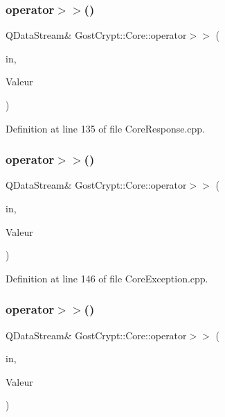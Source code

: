 \subsubsection{\texorpdfstring{operator$>$$>$()}{operator>>()}\hspace{0.1cm}{\footnotesize\ttfamily [21/56]}}
{\footnotesize\ttfamily Q\+Data\+Stream\& Gost\+Crypt\+::\+Core\+::operator$>$$>$ (\begin{DoxyParamCaption}\item[{Q\+Data\+Stream \&}]{in,  }\item[{\hyperlink{struct_gost_crypt_1_1_core_1_1_get_host_devices_response}{Get\+Host\+Devices\+Response} \&}]{Valeur }\end{DoxyParamCaption})}



Definition at line 135 of file Core\+Response.\+cpp.

\mbox{\label{namespace_gost_crypt_1_1_core_a817e52e44a7ae0fb21ee6539aba421c1}} 
\subsubsection{\texorpdfstring{operator$>$$>$()}{operator>>()}\hspace{0.1cm}{\footnotesize\ttfamily [22/56]}}
{\footnotesize\ttfamily Q\+Data\+Stream\& Gost\+Crypt\+::\+Core\+::operator$>$$>$ (\begin{DoxyParamCaption}\item[{Q\+Data\+Stream \&}]{in,  }\item[{\hyperlink{class_gost_crypt_1_1_core_1_1_fail_mount_filesystem}{Gost\+Crypt\+::\+Core\+::\+Fail\+Mount\+Filesystem} \&}]{Valeur }\end{DoxyParamCaption})}



Definition at line 146 of file Core\+Exception.\+cpp.

\mbox{\label{namespace_gost_crypt_1_1_core_a239ed003024a9c505cb3cb08bd8724d6}} 
\subsubsection{\texorpdfstring{operator$>$$>$()}{operator>>()}\hspace{0.1cm}{\footnotesize\ttfamily [23/56]}}
{\footnotesize\ttfamily Q\+Data\+Stream\& Gost\+Crypt\+::\+Core\+::operator$>$$>$ (\begin{DoxyParamCaption}\item[{Q\+Data\+Stream \&}]{in,  }\item[{\hyperlink{struct_gost_crypt_1_1_core_1_1_get_mounted_volumes_response}{Get\+Mounted\+Volumes\+Response} \&}]{Valeur }\end{DoxyParamCaption})}



